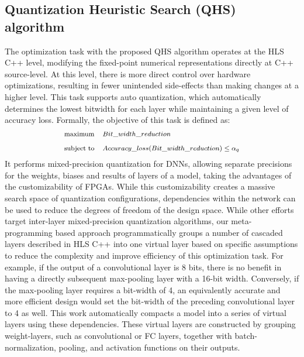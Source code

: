 \subsection{Quantization Heuristic Search (QHS) algorithm}

The optimization task with the proposed QHS algorithm operates at the HLS C++ level, modifying the fixed-point numerical representations directly at C++ source-level. At this level, there is more direct control over hardware optimizations, resulting in fewer unintended side-effects than making changes at a higher level. This task supports auto quantization, which automatically determines the lowest bitwidth for each layer while maintaining a given level of accuracy loss. Formally, the objective of this task is defined as:
\begin{equation}
\begin{footnotesize}
\begin{aligned}
& \underset{}{\text{maximum}}
& & Bit\_width\_reduction \\
& \text{subject to}
& & Accuracy\_loss(Bit\_width\_reduction) \leq \alpha_q 
\end{aligned}
\end{footnotesize}
\end{equation}
It performs mixed-precision quantization for DNNs, allowing separate precisions for the weights, biases and results of layers of a model, taking the advantages of the customizability of FPGAs. 
While this customizability creates a massive search space of quantization configurations, dependencies within the network can be used to reduce the degrees of freedom of the design space. 
While other efforts target inter-layer mixed-precision quantization algorithms, our meta-programming based approach programmatically groups a number of cascaded layers described in HLS C++ into one virtual layer based on specific assumptions to reduce the complexity and improve efficiency of this optimization task. For example, if the output of a convolutional layer is 8 bits, there is no benefit in having a directly subsequent max-pooling layer with a 16-bit width. Conversely, if the max-pooling layer requires a bit-width of 4, an equivalently accurate and more efficient design would set the bit-width of the preceding convolutional layer to 4 as well.  This work automatically compacts a model into a series of virtual layers using these dependencies. These virtual layers are constructed by grouping weight-layers, such as convolutional or FC layers, together with batch-normalization, pooling, and activation functions on their outputs.

